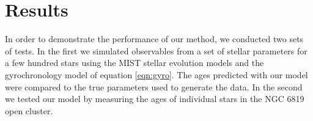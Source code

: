 \section{Results}
\label{section:results}

In order to demonstrate the performance of our method, we conducted two sets
of tests.
In the first we simulated observables from a set of stellar parameters for a
few hundred stars using the MIST stellar evolution models and the
gyrochronology model of equation \ref{eqn:gyro}.
The ages predicted with our model were compared to the true parameters used to
generate the data.
In the second we tested our model by measuring the ages of individual stars in
the NGC 6819 open cluster.

